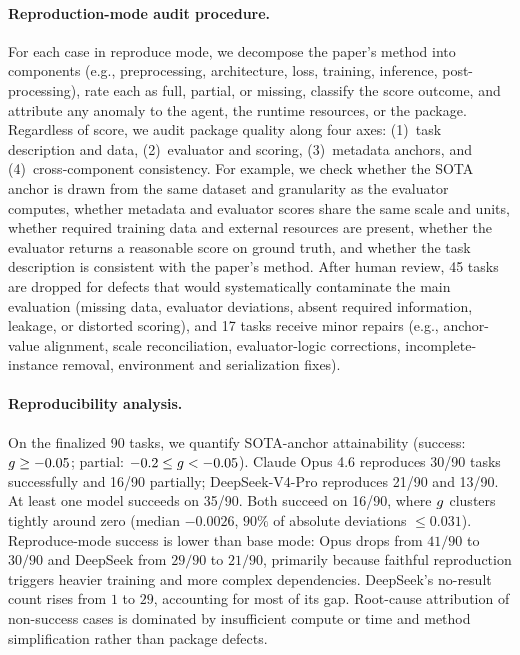 \paragraph{Reproduction-mode audit procedure.}
For each case in reproduce mode, we decompose the paper's method into components (e.g., preprocessing, architecture, loss, training, inference, post-processing), rate each as full, partial, or missing, classify the score outcome, and attribute any anomaly to the agent, the runtime resources, or the package.
Regardless of score, we audit package quality along four axes: (1)~task description and data, (2)~evaluator and scoring, (3)~metadata anchors, and (4)~cross-component consistency. For example, we check whether the SOTA anchor is drawn from the same dataset and granularity as the evaluator computes, whether metadata and evaluator scores share the same scale and units, whether required training data and external resources are present, whether the evaluator returns a reasonable score on ground truth, and whether the task description is consistent with the paper's method.
After human review, 45 tasks are dropped for defects that would systematically contaminate the main evaluation (missing data, evaluator deviations, absent required information, leakage, or distorted scoring), and 17 tasks receive minor repairs (e.g., anchor-value alignment, scale reconciliation, evaluator-logic corrections, incomplete-instance removal, environment and serialization fixes).

\paragraph{Reproducibility analysis.}
On the finalized 90 tasks, we quantify SOTA-anchor attainability (success: $g \ge -0.05$; partial: $-0.2 \le g < -0.05$).
Claude Opus 4.6 reproduces 30/90 tasks successfully and 16/90 partially; DeepSeek-V4-Pro reproduces 21/90 and 13/90. At least one model succeeds on 35/90. Both succeed on 16/90, where $g$ clusters tightly around zero (median $-0.0026$, $90\%$ of absolute deviations $\le 0.031$).
Reproduce-mode success is lower than base mode: Opus drops from $41/90$ to $30/90$ and DeepSeek from $29/90$ to $21/90$, primarily because faithful reproduction triggers heavier training and more complex dependencies. DeepSeek's no-result count rises from $1$ to $29$, accounting for most of its gap. Root-cause attribution of non-success cases is dominated by insufficient compute or time and method simplification rather than package defects.

